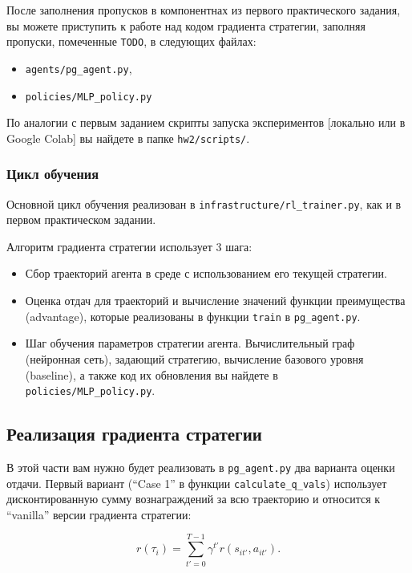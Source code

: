 \documentclass[12pt, oneside]{article}
\begin{document}
После заполнения пропусков в компонентнах из первого практического задания, вы можете приступить к работе над кодом градиента стратегии, заполняя пропуски, помеченные \verb|TODO|, в следующих файлах:

\begin{itemize}
    \item \verb|agents/pg_agent.py|,
    \item \verb|policies/MLP_policy.py|
\end{itemize}

По аналогии с первым заданием скрипты запуска экспериментов [локально или в Google Colab] вы найдете в папке \verb|hw2/scripts/|.

\subsubsection{Цикл обучения}

Основной цикл обучения реализован в \verb|infrastructure/rl_trainer.py|, как и в первом практическом задании.

Алгоритм градиента стратегии использует 3 шага:

\begin{itemize}
    \item Сбор траекторий агента в среде с использованием его текущей стратегии.
    \item Оценка отдач для траекторий и вычисление значений функции преимущества (advantage), которые реализованы в функции \verb|train| в \verb|pg_agent.py|.
    \item Шаг обучения параметров стратегии агента. Вычислительный граф (нейронная сеть), задающий стратегию, вычисление базового уровня (baseline), а также код их обновления вы найдете в \verb|policies/MLP_policy.py|.
\end{itemize}

\subsection{Реализация градиента стратегии}

В этой части вам нужно будет реализовать в \verb|pg_agent.py| два варианта оценки отдачи. Первый вариант (``Case 1'' в функции \verb|calculate_q_vals|) использует дисконтированную сумму вознаграждений за всю траекторию и относится к ``vanilla'' версии градиента стратегии:

\begin{equation}
    r(\tau_i) = \sum_{t' = 0}^{T - 1} {\gamma^{t'} r(s_{it'}, a_{it'})}.
\end{equation}
\end{document}
